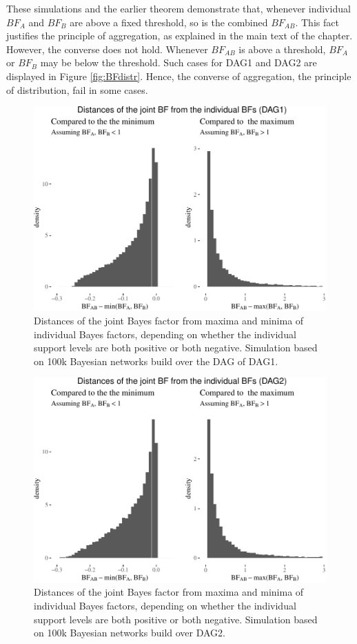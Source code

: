 \documentclass[
  10pt,
  dvipsnames,enabledeprecatedfontcommands]{scrartcl}
\begin{document}
These simulations and the earlier theorem demonstrate that, whenever
individual \(BF_A\) and \(BF_B\) are above a fixed threshold, so is the
combined \(BF_{AB}\). This fact justifies the principle of aggregation,
as explained in the main text of the chapter. However, the converse does
not hold. Whenever \(BF_{AB}\) is above a threshold, \(BF_A\) or
\(BF_B\) may be below the threshold. Such cases for \textsf{DAG1} and
\textsf{DAG2} are displayed in Figure \ref{fig:BFdistr}. Hence, the
converse of aggregation, the principle of distribution, fail in some
cases.

\begin{figure}

\begin{center}\includegraphics[width=0.8\linewidth]{conjunction-appendix14_files/figure-latex/BFind-1} \end{center}
\caption{Distances of the joint Bayes factor from maxima and minima of individual Bayes factors, depending on whether the individual support levels are both positive or both negative. Simulation based on 100k Bayesian networks build over the DAG of \textsf{DAG1}.}
\label{fig:DAG1BF}
\end{figure}

\begin{figure}

\begin{center}\includegraphics[width=0.75\linewidth]{conjunction-appendix14_files/figure-latex/BFind2-1} \end{center}

\caption{Distances of the joint Bayes factor from maxima and minima of individual Bayes factors, depending on whether the individual support levels are both positive or both negative. Simulation based on 100k Bayesian networks build over \textsf{DAG2}.}
\label{fig:BFind2}
\end{figure}
\end{document}
